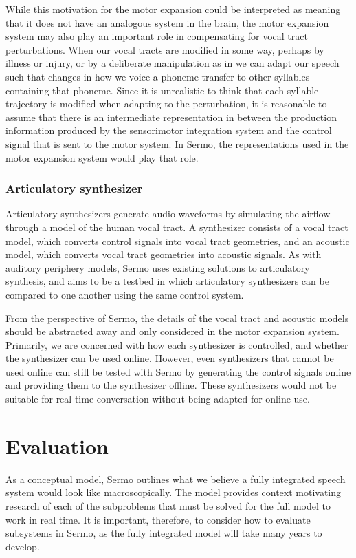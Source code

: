 While this motivation for the
motor expansion could be interpreted
as meaning that it does not
have an analogous system in the brain,
the motor expansion system
may also play an important role
in compensating for vocal tract perturbations.
When our vocal tracts are modified in some way,
perhaps by illness or injury,
or by a deliberate manipulation
as in \citet{houde1998}
we can adapt our speech
such that changes in how we voice a phoneme
transfer to other syllables containing that phoneme.
Since it is unrealistic to think that
each syllable trajectory is modified
when adapting to the perturbation,
it is reasonable to assume that
there is an intermediate representation
in between the production information
produced by the sensorimotor integration system
and the control signal that is sent
to the motor system.
In Sermo, the representations used
in the motor expansion system
would play that role.

\subsubsection{Articulatory synthesizer}

Articulatory synthesizers
generate audio waveforms
by simulating the airflow
through a model of the human vocal tract.
A synthesizer consists of a vocal tract model,
which converts control signals
into vocal tract geometries,
and an acoustic model,
which converts vocal tract geometries
into acoustic signals.
As with auditory periphery models,
Sermo uses existing solutions
to articulatory synthesis,
and aims to be a testbed
in which articulatory synthesizers
can be compared to one another
using the same control system.

From the perspective of Sermo,
the details of the vocal tract
and acoustic models
should be abstracted away
and only considered
in the motor expansion system.
Primarily, we are concerned with
how each synthesizer is controlled,
and whether the synthesizer
can be used online.
However, even synthesizers
that cannot be used online
can still be tested with Sermo
by generating the control signals online
and providing them to the synthesizer offline.
These synthesizers would not be suitable
for real time conversation without
being adapted for online use.

\section{Evaluation}

As a conceptual model,
Sermo outlines what we believe a fully integrated
speech system would look like macroscopically.
The model provides context
motivating research of each
of the subproblems that must be solved
for the full model to work in real time.
It is important, therefore,
to consider how to evaluate
subsystems in Sermo,
as the fully integrated model
will take many years to develop.


